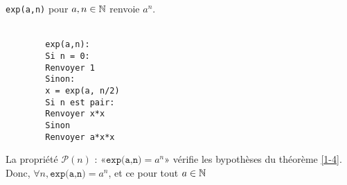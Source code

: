 \begin{example}
	\texttt{exp(a,n)} pour $a,n\in \mathbb{N}$ renvoie $a^n$.\\\\
	\begin{minipage}{0.5\linewidth}
		\begin{lstlisting}
		exp(a,n):
		Si n = 0:
		Renvoyer 1
		Sinon:
		x = exp(a, n/2)
		Si n est pair:
		Renvoyer x*x
		Sinon
		Renvoyer a*x*x
		\end{lstlisting}
	\end{minipage}\quad \begin{minipage}{0.4\linewidth}
		La propriété $\mathcal P(n)$ : «$\texttt{exp(a,n)} = a^n$» vérifie les bypothèses du théorème \ref{1-4}. Donc, $\forall n, \texttt{exp(a,n)} = a^n$, et ce pour tout $a\in \mathbb{N}$
	\end{minipage}
\end{example}
